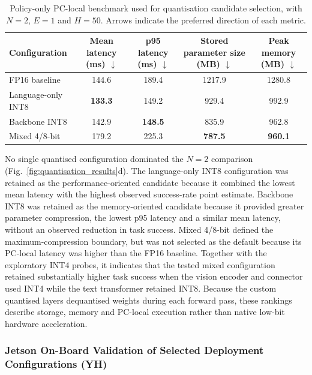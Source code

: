 \begin{table}
  \centering
  \caption{Policy-only PC-local benchmark used for quantisation candidate
  selection, with \(N=2\), \(E=1\) and \(H=50\). Arrows indicate the preferred
  direction of each metric.}
  \label{tab:pc_quant_benchmark}
  \small
  \setlength{\tabcolsep}{4pt}
  \begin{tabular}{@{}lcccc@{}}
    \toprule
    Configuration &
    \shortstack{Mean latency\\(ms) \(\downarrow\)} &
    \shortstack{p95 latency\\(ms) \(\downarrow\)} &
    \shortstack{Stored parameter\\size (MB) \(\downarrow\)} &
    \shortstack{Peak memory\\(MB) \(\downarrow\)} \\
    \midrule
    FP16 baseline      & 144.6 & 189.4 & 1217.9 & 1280.8 \\
    Language-only INT8 & \textbf{133.3} & 149.2 & 929.4 & 992.9 \\
    Backbone INT8      & 142.9 & \textbf{148.5} & 835.9 & 962.8 \\
    Mixed 4/8-bit      & 179.2 & 225.3 & \textbf{787.5} & \textbf{960.1} \\
    \bottomrule
  \end{tabular}
\end{table}

No single quantised configuration dominated the \(N=2\) comparison
(Fig.~\ref{fig:quantisation_results}d). The language-only INT8 configuration
was retained as the performance-oriented
candidate because it combined the lowest mean latency with the highest observed
success-rate point estimate. Backbone INT8 was retained as the memory-oriented
candidate because it provided greater parameter compression, the lowest p95
latency and a similar mean latency, without an observed reduction in task
success. Mixed 4/8-bit defined the maximum-compression boundary, but was not
selected as the default because its PC-local latency was higher than the FP16
baseline. Together with the exploratory INT4 probes, it indicates that the
tested mixed configuration retained substantially higher task success when the
vision encoder and connector used INT4 while the text transformer retained
INT8. Because the custom quantised layers dequantised weights during each
forward pass, these rankings describe storage, memory and PC-local execution
rather than native low-bit hardware acceleration.

\subsubsection{Jetson On-Board Validation of Selected Deployment Configurations (YH)}

